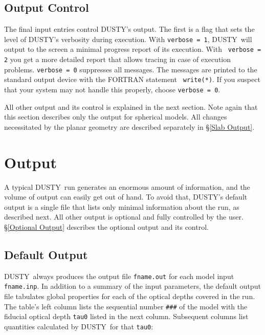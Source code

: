 \documentclass[12pt]{article} \usepackage{epsf}
\def\Section#1{\section{\sc #1}}
\def\D  {{\sf DUSTY}}
\begin{document}
\subsection{Output Control}

The final input entries control \D's output. The first is a flag that sets the
level of \D's verbosity during execution.  With {\tt verbose = 1}, \D\ will
output to the screen a minimal progress report of its execution. With {\tt
verbose = 2} you get a more detailed report that allows tracing in case of
execution problems. {\tt verbose = 0} suppresses all messages.  The messages
are printed to the standard output device with the FORTRAN statement {\tt
write(*)}.  If you suspect that your system may not handle this properly,
choose {\tt verbose = 0}.

All other output and its control is explained in the next section. Note again
that this section describes only the output for spherical models. All changes
necessitated by the planar geometry are described separately in \S\ref{Slab
Output}.


\Section{Output}

A typical \D\ run generates an enormous amount of information, and the volume
of output can easily get out of hand. To avoid that, \D's default output is a
single file that lists only minimal information about the run, as described
next. All other output is optional and fully controlled by the user.
\S\ref{Optional Output} describes the optional output and its control.


\subsection{Default Output}
\label{default}

\D\ always produces the output file {\tt fname.out} for each model input {\tt
fname.inp}. In addition to a summary of the input parameters, the default
output file tabulates global properties for each of the optical depths covered
in the run. The table's left column lists the sequential number {\tt \#\#\#} of
the model with the fiducial optical depth {\tt tau0} listed in the next column.
Subsequent columns list quantities calculated by \D\ for that {\tt tau0}:
\end{document}
